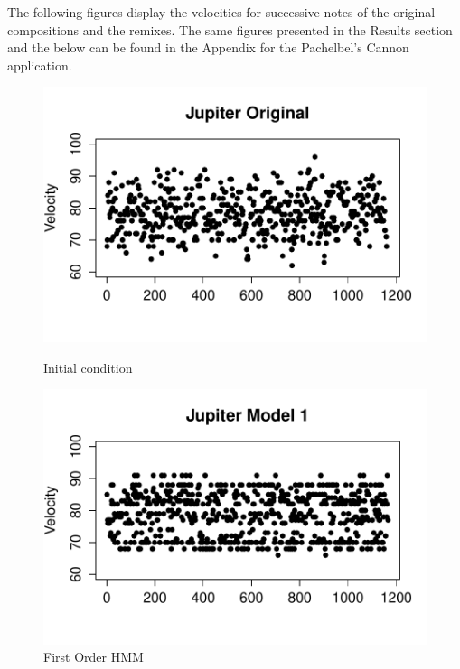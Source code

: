 \documentclass{article} %
\begin{document}
The following figures display the velocities for successive notes of the original compositions and the remixes. The same figures presented in the Results section and the below can be found in the Appendix for the Pachelbel's Cannon application. 

\begin{figure}[ht] 
  \label{ fig7} 
  \begin{minipage}[b]{0.5\linewidth}
    \centering
    \includegraphics[scale = 0.45]{JupiterOriginalVelocity.pdf} 
    \caption{Initial condition} 
    \vspace{4ex}
  \end{minipage}%
  \begin{minipage}[b]{0.5\linewidth}
    \centering
    \includegraphics[scale = 0.45]{JupiterModel1Velocity.pdf} 
    \caption{First Order HMM} 
    \vspace{4ex}
  \end{minipage} 

\end{figure}
\end{document}
